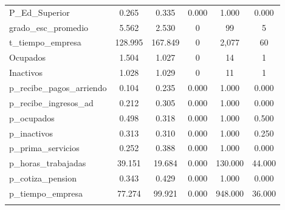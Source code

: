 \begin{table}[!htbp]
\begin{tabular}{@{\extracolsep{5pt}}lccccc}
P\_Ed\_Superior & 0.265 & 0.335 & 0.000 & 1.000 & 0.000 \\ 
grado\_esc\_promedio & 5.562 & 2.530 & 0 & 99 & 5 \\ 
t\_tiempo\_empresa & 128.995 & 167.849 & 0 & 2,077 & 60 \\ 
Ocupados & 1.504 & 1.027 & 0 & 14 & 1 \\ 
Inactivos & 1.028 & 1.029 & 0 & 11 & 1 \\ 
p\_recibe\_pagos\_arriendo & 0.104 & 0.235 & 0.000 & 1.000 & 0.000 \\ 
p\_recibe\_ingresos\_ad & 0.212 & 0.305 & 0.000 & 1.000 & 0.000 \\ 
p\_ocupados & 0.498 & 0.318 & 0.000 & 1.000 & 0.500 \\ 
p\_inactivos & 0.313 & 0.310 & 0.000 & 1.000 & 0.250 \\ 
p\_prima\_servicios & 0.252 & 0.388 & 0.000 & 1.000 & 0.000 \\ 
p\_horas\_trabajadas & 39.151 & 19.684 & 0.000 & 130.000 & 44.000 \\ 
p\_cotiza\_pension & 0.343 & 0.429 & 0.000 & 1.000 & 0.000 \\ 
p\_tiempo\_empresa & 77.274 & 99.921 & 0.000 & 948.000 & 36.000 \\ 
\hline \\[-1.8ex] 
\end{tabular} 
\end{table} 

